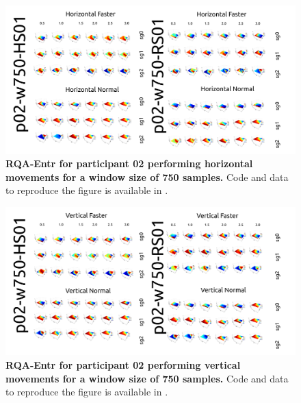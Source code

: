 \documentclass[12pt]{article}
\begin{document}
\newpage
\begin{figure}[ht!]
\centering
\includegraphics{figures/rqa/output/epsilons/rqa-epsilonsp02w750Horizontal}
    	\caption{
	{\bf RQA-Entr for participant 02 performing horizontal movements for a window size of 750 samples.}
	Code and data to reproduce the figure is available in \cite{srep2021}.
        }
    \label{fig-p02-H-w750}
\end{figure}
\begin{figure}[hb!]
\centering
\includegraphics{figures/rqa/output/epsilons/rqa-epsilonsp02w750Vertical}
    	\caption{
	{\bf RQA-Entr for participant 02 performing vertical movements for a window size of 750 samples.}
	Code and data to reproduce the figure is available in \cite{srep2021}.
        }
    \label{fig-p02-V-w750}
\end{figure}
\end{document}
